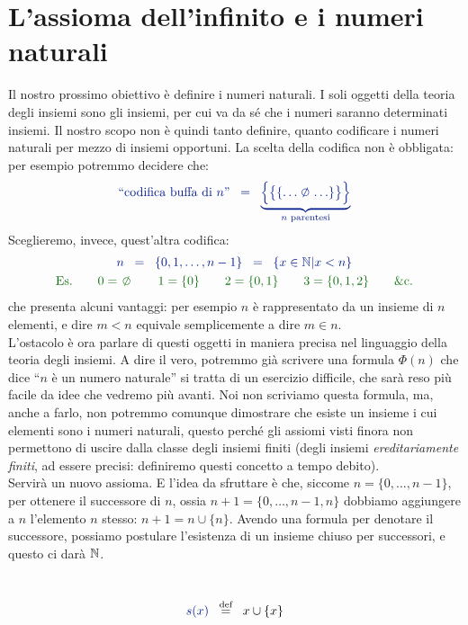\section{L'assioma dell'infinito e i numeri naturali}
Il nostro prossimo obiettivo \`e definire i numeri naturali. I soli oggetti della teoria degli insiemi sono gli insiemi, per cui va da s\'e che 
i numeri saranno determinati insiemi. Il nostro scopo non \`e quindi tanto definire, quanto codificare i numeri naturali per mezzo di insiemi opportuni.
La scelta della codifica non \`e obbligata: per esempio potremmo decidere che:
\[ \drkblu \text{``codifica buffa di $n$''} \;\;=\;\; \underbrace{\Big\oldparen\big\oldparen\{\ldots \emptyset\ldots\}\big\}\Big\}}_{\text{$n$ parentesi}}
	\]
Sceglieremo, invece, quest'altra codifica:
\begin{gather*}
 {\drkblu n \;\;=\;\; \{0,1,\ldots,n-1\} \;\;=\;\; \{x \in \NN | x < n\}} \\
{\drkgrn \text{Es.}\qquad 0 = \emptyset \qquad 1 = \{0\} \qquad 2 = \{0,1\} \qquad 3 = \{0,1,2\} \qquad \text{\etc.} }
\end{gather*}
che presenta alcuni vantaggi: per esempio $n$ \`e rappresentato da un insieme di $n$ elementi, e dire $m < n$ equivale semplicemente a dire $m \in n$.\\
L'ostacolo \`e ora parlare di questi oggetti in maniera precisa nel linguaggio della teoria degli insiemi. A dire il vero, potremmo gi\`a scrivere una formula $\Phi(n)$ che dice 
``$n$ \`e un numero naturale'' si tratta di un {\drkred esercizio difficile,} che sar\`a reso pi\`u facile da idee che vedremo pi\`u avanti. Noi non scriviamo questa formula, ma, anche a farlo,
non potremmo comunque dimostrare che esiste un insieme i cui elementi sono i numeri naturali, questo perch\'e gli assiomi visti finora non permettono di uscire dalla classe degli insiemi finiti (degli insiemi
\textit{ereditariamente finiti},
ad essere precisi: definiremo questi concetto a tempo debito).\\
Servir\`a un nuovo assioma. E l'idea da sfruttare \`e che, siccome $n = \{0,\ldots,n-1\}$, per ottenere il successore di $n$, ossia $n+1 = \{0,\ldots,n-1,n\}$ dobbiamo aggiungere a $n$ l'elemento $n$ stesso: $n+1 = n \cup \{n\}$.
Avendo una formula per denotare il successore, possiamo postulare l'esistenza di un insieme chiuso per successori, e questo ci dar\`a $\mathbb N$.

\begin{definition}[Successore]
\ 
\baselineskip
	\[ {\drkblu s(x)} \;\;\Mydef\;\; x \cup \{x\}
		\]
\end{definition}


